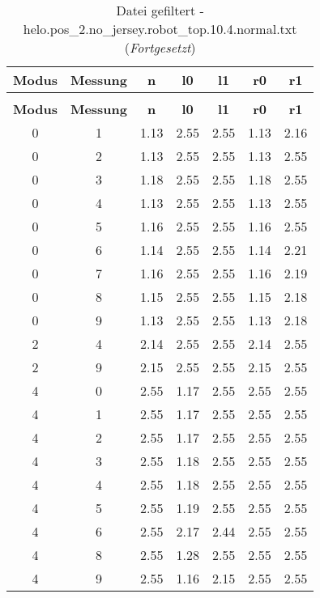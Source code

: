 \clearpage{}
\begin{longtable}{|c|c||c||c|c||c|c|}
	\caption{Datei gefiltert - helo.pos\_2.no\_jersey.robot\_top.10.4.normal.txt} \label{tab:helo.pos-2.no-jersey.robot-top.10.4.normal.txt} \\ \hline
	\textbf{Modus} & \textbf{Messung} & \textbf{n} & \textbf{l0} & \textbf{l1} & \textbf{r0} & \textbf{r1}\\ \hline
	\endfirsthead
	\caption[]{Datei gefiltert - helo.pos\_2.no\_jersey.robot\_top.10.4.normal.txt (\emph{Fortgesetzt})} \\ \hline
	\textbf{Modus} & \textbf{Messung} & \textbf{n} & \textbf{l0} & \textbf{l1} & \textbf{r0} & \textbf{r1}\\ \hline
	\endhead
	0 & 1 & 1.13 & 2.55 & 2.55 & 1.13 & 2.16 \\ \hline
	0 & 2 & 1.13 & 2.55 & 2.55 & 1.13 & 2.55 \\ \hline
	0 & 3 & 1.18 & 2.55 & 2.55 & 1.18 & 2.55 \\ \hline
	0 & 4 & 1.13 & 2.55 & 2.55 & 1.13 & 2.55 \\ \hline
	0 & 5 & 1.16 & 2.55 & 2.55 & 1.16 & 2.55 \\ \hline
	0 & 6 & 1.14 & 2.55 & 2.55 & 1.14 & 2.21 \\ \hline
	0 & 7 & 1.16 & 2.55 & 2.55 & 1.16 & 2.19 \\ \hline
	0 & 8 & 1.15 & 2.55 & 2.55 & 1.15 & 2.18 \\ \hline
	0 & 9 & 1.13 & 2.55 & 2.55 & 1.13 & 2.18 \\ \hline
	2 & 4 & 2.14 & 2.55 & 2.55 & 2.14 & 2.55 \\ \hline
	2 & 9 & 2.15 & 2.55 & 2.55 & 2.15 & 2.55 \\ \hline
	4 & 0 & 2.55 & 1.17 & 2.55 & 2.55 & 2.55 \\ \hline
	4 & 1 & 2.55 & 1.17 & 2.55 & 2.55 & 2.55 \\ \hline
	4 & 2 & 2.55 & 1.17 & 2.55 & 2.55 & 2.55 \\ \hline
	4 & 3 & 2.55 & 1.18 & 2.55 & 2.55 & 2.55 \\ \hline
	4 & 4 & 2.55 & 1.18 & 2.55 & 2.55 & 2.55 \\ \hline
	4 & 5 & 2.55 & 1.19 & 2.55 & 2.55 & 2.55 \\ \hline
	4 & 6 & 2.55 & 2.17 & 2.44 & 2.55 & 2.55 \\ \hline
	4 & 8 & 2.55 & 1.28 & 2.55 & 2.55 & 2.55 \\ \hline
	4 & 9 & 2.55 & 1.16 & 2.15 & 2.55 & 2.55 \\ \hline

\end{longtable}
